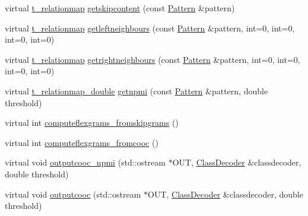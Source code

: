 \begin{DoxyCompactItemize}
\item 
virtual \hyperlink{patternmodel_8h_a8695a2b10be5a74c827cd6c11bd46fb9}{t\+\_\+relationmap} \hyperlink{classPatternModel_aa9d5de68d7989ba234d2628ab4af35fb}{getskipcontent} (const \hyperlink{classPattern}{Pattern} \&pattern)
\item 
virtual \hyperlink{patternmodel_8h_a8695a2b10be5a74c827cd6c11bd46fb9}{t\+\_\+relationmap} \hyperlink{classPatternModel_aea7593acd2798e2e77ed5cb4e75d3f67}{getleftneighbours} (const \hyperlink{classPattern}{Pattern} \&pattern, int=0, int=0, int=0, int=0)
\item 
virtual \hyperlink{patternmodel_8h_a8695a2b10be5a74c827cd6c11bd46fb9}{t\+\_\+relationmap} \hyperlink{classPatternModel_ad34484b6262acb5967de624a14e73085}{getrightneighbours} (const \hyperlink{classPattern}{Pattern} \&pattern, int=0, int=0, int=0, int=0)
\item 
virtual \hyperlink{patternmodel_8h_ae13b52c8cf777358f19da17c90c7dac0}{t\+\_\+relationmap\+\_\+double} \hyperlink{classPatternModel_a0be06240959a62b03473c7a00ccebdd1}{getnpmi} (const \hyperlink{classPattern}{Pattern} \&pattern, double threshold)
\item 
virtual int \hyperlink{classPatternModel_ab393fff93aae08db7456a9e60296a0b3}{computeflexgrams\+\_\+fromskipgrams} ()
\item 
virtual int \hyperlink{classPatternModel_abc0a0314553ad6237838b44f14e45309}{computeflexgrams\+\_\+fromcooc} ()
\item 
virtual void \hyperlink{classPatternModel_a45da84761e93772df0465bca2780b9b3}{outputcooc\+\_\+npmi} (std\+::ostream $\ast$O\+U\+T, \hyperlink{classClassDecoder}{Class\+Decoder} \&classdecoder, double threshold)
\item 
virtual void \hyperlink{classPatternModel_a107980d1345c1f20ba3284474220ee7e}{outputcooc} (std\+::ostream $\ast$O\+U\+T, \hyperlink{classClassDecoder}{Class\+Decoder} \&classdecoder, double threshold)
\end{DoxyCompactItemize}

